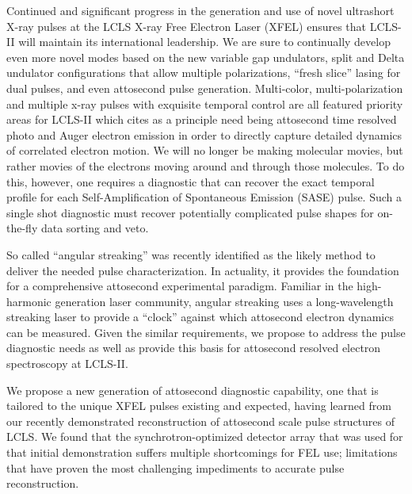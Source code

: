 Continued and significant progress in the generation and use of novel ultrashort X-ray pulses at the LCLS X-ray Free Electron Laser (XFEL) ensures that LCLS-II will maintain its international leadership. 
We are sure to continually develop even more novel modes based on the new variable gap undulators, split and Delta undulator configurations that allow multiple polarizations, ``fresh slice'' lasing for dual pulses, and even attosecond pulse generation. 
Multi-color, multi-polarization and multiple x-ray pulses with exquisite temporal control are all featured priority areas for LCLS-II which cites as a principle need being attosecond time resolved photo and Auger electron emission in order to directly capture detailed dynamics of correlated electron motion. 
We will no longer be making molecular movies, but rather movies of the electrons moving around and through those molecules.
To do this, however, one requires a diagnostic that can recover the exact temporal profile for each Self-Amplification of Spontaneous Emission (SASE) pulse. 
Such a single shot diagnostic must recover potentially complicated pulse shapes for on-the-fly data sorting and veto.

So called ``angular streaking'' was recently identified as the likely method to deliver the needed pulse characterization.
In actuality, it provides the foundation for a comprehensive attosecond experimental paradigm. 
Familiar in the high-harmonic generation laser community, angular streaking uses a long-wavelength streaking laser to provide a ``clock'' against which attosecond electron dynamics can be measured. 
Given the similar requirements, we propose to address the pulse diagnostic needs as well as provide this basis for attosecond resolved electron spectroscopy at LCLS-II.

We propose a new generation of attosecond diagnostic capability, one that is tailored to the unique XFEL pulses existing and expected, having learned from our recently demonstrated reconstruction of attosecond scale pulse structures of LCLS. 
We found that the synchrotron-optimized detector array that was used for that initial demonstration suffers multiple shortcomings for FEL use; limitations that have proven the most challenging impediments to accurate pulse reconstruction. 

